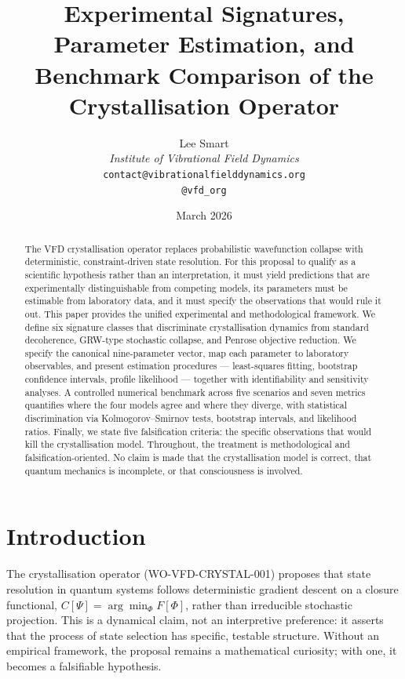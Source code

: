 \documentclass[12pt]{article}
\title{Experimental Signatures, Parameter Estimation, and Benchmark Comparison of the Crystallisation Operator}
\author{%
  Lee Smart\\[4pt]
  \textit{Institute of Vibrational Field Dynamics}\\[2pt]
  \texttt{contact@vibrationalfielddynamics.org}\\[2pt]
  \texttt{@vfd\_org}%
}
\date{March 2026}
\begin{document}
\maketitle

\begin{abstract}
The VFD crystallisation operator replaces probabilistic wavefunction collapse with deterministic, constraint-driven state resolution. For this proposal to qualify as a scientific hypothesis rather than an interpretation, it must yield predictions that are experimentally distinguishable from competing models, its parameters must be estimable from laboratory data, and it must specify the observations that would rule it out. This paper provides the unified experimental and methodological framework. We define six signature classes that discriminate crystallisation dynamics from standard decoherence, GRW-type stochastic collapse, and Penrose objective reduction. We specify the canonical nine-parameter vector, map each parameter to laboratory observables, and present estimation procedures --- least-squares fitting, bootstrap confidence intervals, profile likelihood --- together with identifiability and sensitivity analyses. A controlled numerical benchmark across five scenarios and seven metrics quantifies where the four models agree and where they diverge, with statistical discrimination via Kolmogorov--Smirnov tests, bootstrap intervals, and likelihood ratios. Finally, we state five falsification criteria: the specific observations that would kill the crystallisation model. Throughout, the treatment is methodological and falsification-oriented. No claim is made that the crystallisation model is correct, that quantum mechanics is incomplete, or that consciousness is involved.
\end{abstract}

\section{Introduction}
\label{sec:intro}

The crystallisation operator (WO-VFD-CRYSTAL-001) proposes that state resolution in quantum systems follows deterministic gradient descent on a closure functional, $C[\Psi] = \arg\min_\Phi F[\Phi]$, rather than irreducible stochastic projection. This is a dynamical claim, not an interpretive preference: it asserts that the process of state selection has specific, testable structure. Without an empirical framework, the proposal remains a mathematical curiosity; with one, it becomes a falsifiable hypothesis.
\end{document}
